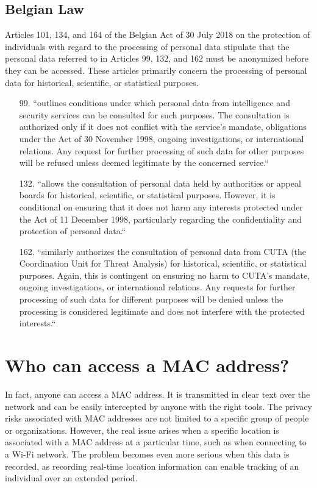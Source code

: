 \documentclass[aps,prb,twocolumn,superscriptaddress,floatfix,longbibliography,nofootinbib]{revtex4-2}
\begin{document}
  \subsection{\label{subsec:BEL}Belgian Law}

  Articles 101, 134, and 164 of the Belgian Act of 30 July 2018 on the protection
  of individuals with regard to the processing of personal data
  stipulate that the personal data referred to in
  Articles 99, 132, and 162 must be anonymized before they can be accessed. 
  These articles primarily concern the processing of personal data for historical, 
  scientific, or statistical purposes.

    \begin{enumerate}
    \item[99.] ``outlines conditions under which personal data from intelligence 
    and security services can be consulted for such purposes. The consultation 
    is authorized only if it does not conflict with the service’s mandate, obligations 
    under the Act of 30 November 1998, ongoing investigations, or international relations. 
    Any request for further processing of such data for other purposes will be refused 
    unless deemed legitimate by the concerned service.``

    \item[132.] ``allows the consultation of personal data held by authorities or 
    appeal boards for historical, scientific, or statistical purposes. However, 
    it is conditional on ensuring that it does not harm any interests protected 
    under the Act of 11 December 1998, particularly regarding the confidentiality 
    and protection of personal data.``

    \item[162.] ``similarly authorizes the consultation of personal data from CUTA 
    (the Coordination Unit for Threat Analysis) for historical, scientific, or 
    statistical purposes. Again, this is contingent on ensuring no harm to CUTA’s 
    mandate, ongoing investigations, or international relations. Any requests for 
    further processing of such data for different purposes will be denied unless 
    the processing is considered legitimate and does not interfere with the 
    protected interests.``
    \end{enumerate}
  \cite{BelgianAct2018}

\section{\label{sec:Who}Who can access a MAC address?}
  In fact, anyone can access a MAC address. It is transmitted in clear text over 
  the network and can be easily intercepted by anyone with the right tools. The privacy risks associated
  with MAC addresses are not limited to a specific group of people or organizations.
  However, the real issue arises when a specific location is associated with a 
  MAC address at a particular time, such as when connecting to a Wi-Fi network. 
  The problem becomes even more serious when this data is recorded, as recording 
  real-time location information can enable tracking of an individual over an 
  extended period.
\end{document}

